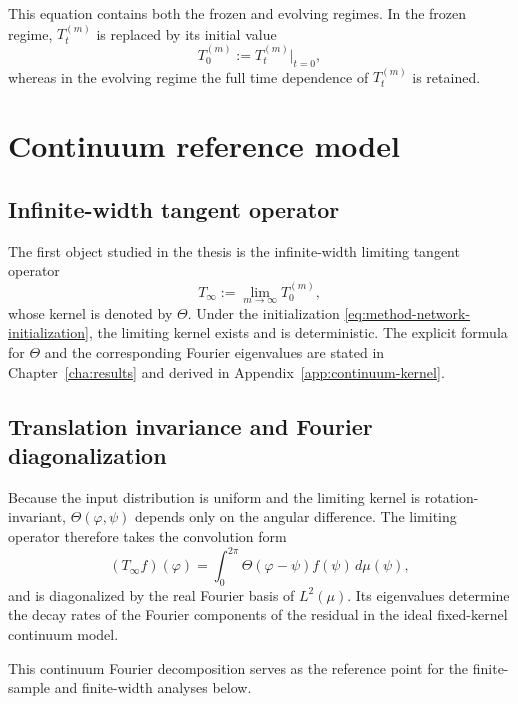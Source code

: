 This equation contains both the frozen and evolving regimes. In the frozen regime,
\(T_t^{(m)}\) is replaced by its initial value
\begin{equation}
	T_0^{(m)}:=T_t^{(m)}\big|_{t=0},
	\label{eq:method-frozen-operator}
\end{equation}
whereas in the evolving regime the full time dependence of \(T_t^{(m)}\) is retained.

\section{Continuum reference model}

\subsection{Infinite-width tangent operator}

The first object studied in the thesis is the infinite-width limiting tangent operator
\begin{equation}
	T_\infty:=\lim_{m\to\infty} T_0^{(m)},
	\label{eq:method-infinite-width-operator}
\end{equation}
whose kernel is denoted by \(\Theta\). Under the initialization
\eqref{eq:method-network-initialization}, the limiting kernel exists and is deterministic.
The explicit formula for \(\Theta\) and the corresponding Fourier eigenvalues are stated in
Chapter~\ref{cha:results} and derived in Appendix~\ref{app:continuum-kernel}.

\subsection{Translation invariance and Fourier diagonalization}

Because the input distribution is uniform and the limiting kernel is rotation-invariant,
\(\Theta(\varphi,\psi)\) depends only on the angular difference. The limiting operator
therefore takes the convolution form
\begin{equation}
	(T_\infty f)(\varphi)
	=
	\int_0^{2\pi}\Theta(\varphi-\psi)f(\psi)\,d\mu(\psi),
	\label{eq:method-continuum-operator}
\end{equation}
and is diagonalized by the real Fourier basis of \(L^2(\mu)\). Its eigenvalues determine the
decay rates of the Fourier components of the residual in the ideal fixed-kernel continuum
model.

This continuum Fourier decomposition serves as the reference point for the finite-sample and
finite-width analyses below.

